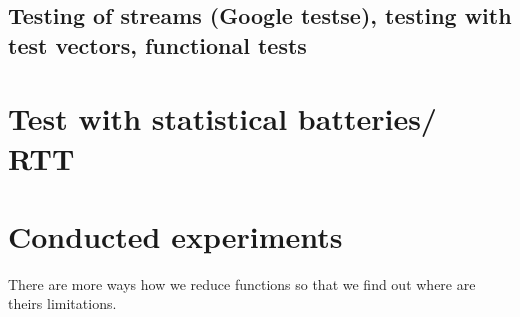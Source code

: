 \documentclass[
    digital,    %
    oneside,    %
    color,
    11pt,
    nocover,
    notable,
    nolof,
    nolot,
    final
]{fithesis3}
\begin{document}
\subsection{Testing of streams (Google testse), testing with test vectors, functional tests}

\section{Test with statistical batteries/ RTT}

\section{Conducted experiments}

There are more ways how we reduce functions so that we find out where are theirs limitations. 
\end{document}
